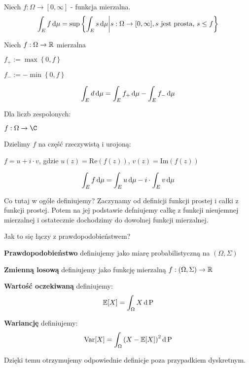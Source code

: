 \begin{definition}
    Niech \( f: \Omega\to [0, \infty] \) - funkcja mierzalna.
    \[
        \int_E f \mathop{}\!\mathrm{d} \mu = \sup \left\{\int_E s \mathop{}\!\mathrm{d} \mu \middle| s: \Omega\to [0, \infty], s \text{ jest prosta, } s \leq f \right\}
    \]
\end{definition}

\begin{definition}
    Niech  \( f: \Omega\to \mathbb{R} \) mierzalna

    \( f_+ := \max \left\{0, f\right\} \)

    \( f_- := -\min \left\{0, f\right\} \)

    \[
        \int_E d \mathop{}\!\mathrm{d} \mu = \int_E f_+ \mathop{}\!\mathrm{d} \mu - \int_E f_- \mathop{}\!\mathrm{d} \mu
    \]
\end{definition}

\begin{definition}
    Dla liczb zespolonych:

    \( f: \Omega\to \C \)

    Dzielimy \( f \) na część rzeczywistą i urojoną:

    \( f = u + i \cdot v \), gdzie \( u\left( z \right) = \text{Re}\left( f\left( z \right) \right) \), \( v\left( z \right) = \text{Im}\left( f\left( z \right) \right) \)

    \[
        \int_E f \mathop{}\!\mathrm{d} \mu = \int_E u \mathop{}\!\mathrm{d} \mu - i \cdot \int_E v \mathop{}\!\mathrm{d} \mu
    \]
\end{definition}

Co tutaj w ogóle definiujemy? Zaczynamy od definicji funkcji prostej i całki z funkcji prostej. Potem na jej podstawie defniujemy całkę z funkcji nieujemnej mierzalnej i ostatecznie dochodzimy do dowolnej funkcji mierzalnej.


\begin{corollary}

    Jak to się łączy z prawdopodobieństwem?

    \textbf{Prawdopodobieństwo} definiujemy jako miarę probabilistyczną na \( \left( \Omega, \Sigma \right) \)

    \textbf{Zmienną losową} definiujemy jako funkcję mierzalną \( f: \left( \Omega, \Sigma \right) \to \mathbb{R} \)

    \textbf{Wartość oczekiwaną} definiujemy:
    \[
        \expected{X} = \int_{\Omega} X \diff \prob
    \]

    \textbf{Wariancję} definiujemy:
    \[
        \variance{X} = \int_{\Omega} \left( X - \expected{X} \right)^2 \diff \prob
    \]

    Dzięki temu otrzymujemy odpowiednie definicje poza przypadkiem dyskretnym.
\end{corollary}

